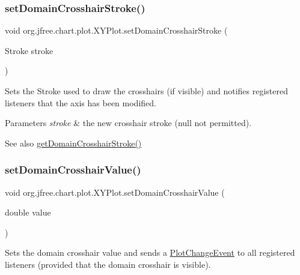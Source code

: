 \subsubsection{\texorpdfstring{set\+Domain\+Crosshair\+Stroke()}{setDomainCrosshairStroke()}}
{\footnotesize\ttfamily void org.\+jfree.\+chart.\+plot.\+X\+Y\+Plot.\+set\+Domain\+Crosshair\+Stroke (\begin{DoxyParamCaption}\item[{Stroke}]{stroke }\end{DoxyParamCaption})}

Sets the Stroke used to draw the crosshairs (if visible) and notifies registered listeners that the axis has been modified.


\begin{DoxyParams}{Parameters}
{\em stroke} & the new crosshair stroke ({\ttfamily null} not permitted).\\
\hline
\end{DoxyParams}
\begin{DoxySeeAlso}{See also}
\mbox{\hyperlink{classorg_1_1jfree_1_1chart_1_1plot_1_1_x_y_plot_a764aae9df73c20a28fc79cede021d9e2}{get\+Domain\+Crosshair\+Stroke()}} 
\end{DoxySeeAlso}
\mbox{\label{classorg_1_1jfree_1_1chart_1_1plot_1_1_x_y_plot_a00691ca44150f95ff515fb987e734585}} 
\subsubsection{\texorpdfstring{set\+Domain\+Crosshair\+Value()}{setDomainCrosshairValue()}\hspace{0.1cm}{\footnotesize\ttfamily [1/2]}}
{\footnotesize\ttfamily void org.\+jfree.\+chart.\+plot.\+X\+Y\+Plot.\+set\+Domain\+Crosshair\+Value (\begin{DoxyParamCaption}\item[{double}]{value }\end{DoxyParamCaption})}

Sets the domain crosshair value and sends a \mbox{\hyperlink{}{Plot\+Change\+Event}} to all registered listeners (provided that the domain crosshair is visible).


